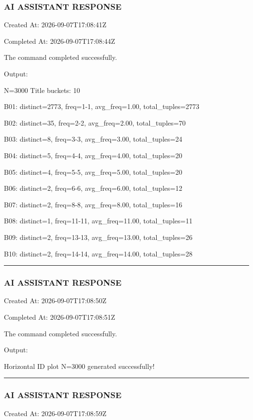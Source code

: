 \documentclass[11pt,a4paper]{article}
\begin{document}
\subsubsection{AI ASSISTANT RESPONSE}

Created At: 2026-09-07T17:08:41Z

Completed At: 2026-09-07T17:08:44Z


The command completed successfully.

Output:

N=3000 Title buckets: 10

B01: distinct=2773, freq=1-1, avg\_freq=1.00, total\_tuples=2773

B02: distinct=35, freq=2-2, avg\_freq=2.00, total\_tuples=70

B03: distinct=8, freq=3-3, avg\_freq=3.00, total\_tuples=24

B04: distinct=5, freq=4-4, avg\_freq=4.00, total\_tuples=20

B05: distinct=4, freq=5-5, avg\_freq=5.00, total\_tuples=20

B06: distinct=2, freq=6-6, avg\_freq=6.00, total\_tuples=12

B07: distinct=2, freq=8-8, avg\_freq=8.00, total\_tuples=16

B08: distinct=1, freq=11-11, avg\_freq=11.00, total\_tuples=11

B09: distinct=2, freq=13-13, avg\_freq=13.00, total\_tuples=26

B10: distinct=2, freq=14-14, avg\_freq=14.00, total\_tuples=28


\hrule

\subsubsection{AI ASSISTANT RESPONSE}

Created At: 2026-09-07T17:08:50Z

Completed At: 2026-09-07T17:08:51Z


The command completed successfully.

Output:

Horizontal ID plot N=3000 generated successfully!


\hrule

\subsubsection{AI ASSISTANT RESPONSE}

Created At: 2026-09-07T17:08:59Z
\end{document}
